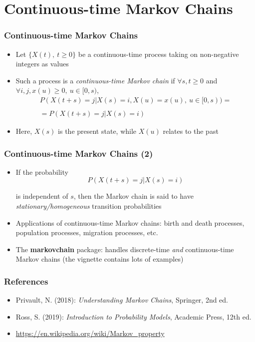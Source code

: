\documentclass[10pt]{beamer}
\theoremstyle{definition}
\begin{document}
\section{Continuous-time Markov Chains}
\begin{frame}[fragile]
	\frametitle{Continuous-time Markov Chains}
	\begin{itemize}
		\item Let $ \{X(t), \ t \geq 0\} $ be a continuous-time process taking on non-negative integers as values
		
		\item Such a process is a \textit{continuous-time Markov chain} if $ \forall s,t \geq 0 $ and $ \forall i, j, x(u) \geq 0, \ u \in [0,s) $,
		\[
			\begin{array}{lcl}
				P(X(t+s) = j | X(s) = i, X(u) = x(u),  \ u \in [0,s) ) = \\
				\quad\\
				=  P(X(t+s) = j | X(s) = i)
			\end{array}
		\]
		
		\item Here, $ X(s) $ is the present state, while $ X(u) $ relates to the past
	\end{itemize}
\end{frame}

\begin{frame}[fragile]
	\frametitle{Continuous-time Markov Chains (2)}
	\begin{itemize}
		\item If the probability
		\[
			P(X(t+s) = j | X(s) = i)
		\]
		
		is independent of $ s $, then the Markov chain is said to have \textit{stationary/homogeneous} transition probabilities
		
		\item Applications of continuous-time Markov chains: birth and death processes, population processes, migration processes, etc.
		
		\item The \textbf{markovchain} package: handles discrete-time \textit{and} continuous-time Markov chains (the vignette contains lots of examples)
	\end{itemize}
\end{frame}

\begin{frame}[fragile]
	\frametitle{References}
	\begin{itemize}
		\item Privault, N. (2018): \textit{Understanding Markov Chains}, Springer, 2nd ed.
		
		\item Ross, S. (2019): \textit{Introduction to Probability Models}, Academic Press, 12th ed.
		
		\item \url{https://en.wikipedia.org/wiki/Markov_property}
	\end{itemize}
\end{frame}
\end{document}

